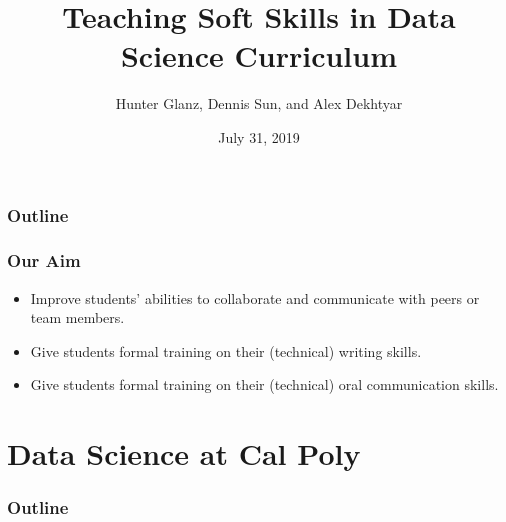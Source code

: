 \documentclass[xcolor={dvipsnames}]{beamer}
\title[]{Teaching Soft Skills in Data Science Curriculum}
\author[Glanz]{Hunter Glanz, Dennis Sun, and Alex Dekhtyar}
\institute[]{California Polytechnic State University \\ San Luis Obispo, California, USA}
\date{July 31, 2019}
\newcommand{\ft}{\frametitle}
\newcommand{\bi}{\begin{itemize}}
\newcommand{\ei}{\end{itemize}}
\begin{document}
\frame{\titlepage}

\begin{frame}
\frametitle{Outline}
\tableofcontents
\end{frame}

\begin{frame}
\ft{Our Aim}
\bi
	\item Improve students' abilities to collaborate and communicate with peers or team members.
	\pause
	\item Give students formal training on their (technical) writing skills.
	\pause
	\item Give students formal training on their (technical) oral communication skills.
\ei
\end{frame}

\section{Data Science at Cal Poly}

\begin{frame}
\frametitle{Outline}
\tableofcontents[currentsection]
\end{frame}
\end{document}
